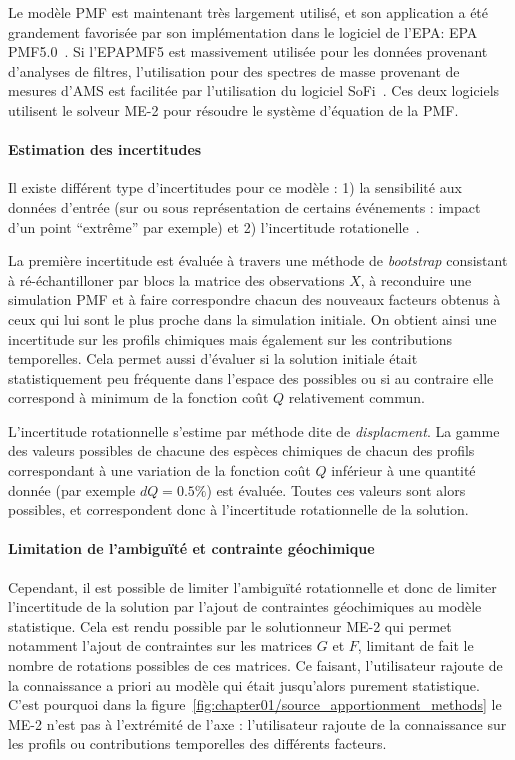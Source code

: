 Le modèle PMF est maintenant très largement utilisé, et son application a été grandement
favorisée
par son implémentation dans le logiciel de l'EPA: EPA PMF5.0~\autocite{norrisEPA2014}.
Si l'EPAPMF5 est massivement utilisée pour les données provenant d'analyses de
filtres, l'utilisation pour des spectres de masse provenant de mesures d'AMS est facilitée par
l'utilisation du logiciel SoFi~\autocite{canonacoSoFi2013}. Ces deux logiciels utilisent
le solveur ME-2 pour résoudre le système d'équation de la PMF.

\paragraph{Estimation des incertitudes}%
\label{par:incertitudes}

Il existe différent type d'incertitudes pour ce modèle : 1) la sensibilité aux données
d'entrée (sur ou sous représentation de certains événements : impact d'un point
``extrême'' par exemple) et 2) l'incertitude rotationelle~\autocite{brownMethods2015}.

La première incertitude est évaluée à travers une méthode de \textit{bootstrap} consistant
à ré-échantilloner par blocs la matrice des observations $X$, à reconduire une simulation
PMF et à faire correspondre chacun des nouveaux facteurs obtenus à ceux qui lui sont le
plus proche dans la simulation initiale.
On obtient ainsi une incertitude sur les profils chimiques mais également sur les
contributions temporelles.
Cela permet aussi d'évaluer si la solution initiale était statistiquement peu fréquente
dans l'espace des possibles ou si au contraire elle correspond à minimum de la fonction
coût $Q$ relativement commun.

L'incertitude rotationnelle s'estime par méthode dite de \textit{displacment}. La gamme des
valeurs possibles de chacune des espèces chimiques de chacun des profils correspondant à
une variation de la fonction coût $Q$ inférieur à une quantité donnée (par exemple $dQ =
0.5\%$) est évaluée. Toutes ces valeurs sont alors possibles, et correspondent donc à
l'incertitude rotationnelle de la solution.

\paragraph{Limitation de l'ambiguïté et contrainte géochimique}%
\label{par:limitation_de_l_ambiguité_et_contrainte_géochimique}

Cependant, il est possible de limiter l'ambiguïté rotationnelle et donc de limiter
l'incertitude de la solution par l'ajout de contraintes géochimiques au modèle statistique.
Cela est rendu possible par le solutionneur ME-2 qui permet notamment l'ajout de contraintes
sur les matrices $G$ et $F$, limitant de fait le nombre de rotations possibles de ces
matrices. Ce faisant, l'utilisateur rajoute de la connaissance a priori au modèle qui
était jusqu'alors purement statistique. C'est pourquoi dans la
figure~\ref{fig:chapter01/source_apportionment_methods} le ME-2 n'est pas à l'extrémité de
l'axe : l'utilisateur rajoute de la connaissance sur les profils ou contributions
temporelles des différents facteurs.


